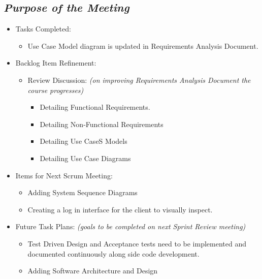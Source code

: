 \documentclass[a4paper]{article}
\begin{document}
\subsection{\textit{Purpose of the Meeting}}

\begin{itemize}

\item Tasks Completed:

\begin{itemize}

\item Use Case Model diagram is updated in Requirements Analysis Document.

\end{itemize}

\item Backlog Item Refinement:

\begin{itemize}

\item Review Discussion: \emph{(on improving Requirements Analysis Document the course progresses)}

\begin{itemize}

\item Detailing Functional Requirements.

\item Detailing Non-Functional Requirements

\item Detailing Use CaseS Models

\item Detailing Use Case Diagrams

\end{itemize}

\end{itemize}

\item Items for Next Scrum Meeting:

\begin{itemize}

\item Adding System Sequence Diagrams

\item Creating a log in interface for the client to visually inspect.

\end{itemize}

\item Future Task Plans: \emph{(goals to be completed on next Sprint Review meeting)}

\begin{itemize}

\item Test Driven Design and Acceptance tests need to be implemented and documented continuously along side code development.

\item Adding Software Architecture and Design

\end{itemize}

\end{itemize}
\end{document}
